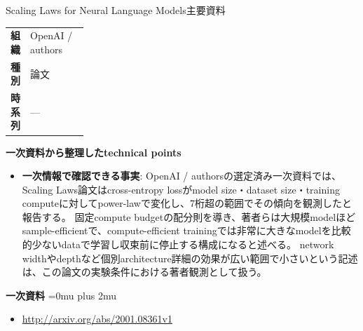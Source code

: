 \begin{technicalnote}{Scaling Laws for Neural Language Models}{主要資料}
\begingroup
\begin{tabularx}{\linewidth}{@{}>{\bfseries}p{0.22\linewidth}X@{}}
組織 & OpenAI / authors \\
種別 & 論文 \\
時系列 & — \\
\end{tabularx}
\smallskip
{\bfseries 一次資料から整理したtechnical points}
\begin{itemize}[leftmargin=1.5em,itemsep=0.35em]
\item \textbf{一次情報で確認できる事実}: OpenAI / authorsの選定済み一次資料では、Scaling Laws論文はcross-entropy lossがmodel size・dataset size・training computeに対してpower-lawで変化し、7桁超の範囲でその傾向を観測したと報告する。 固定compute budgetの配分則を導き、著者らは大規模modelほどsample-efficientで、compute-efficient trainingでは非常に大きなmodelを比較的少ないdataで学習し収束前に停止する構成になると述べる。 network widthやdepthなど個別architecture詳細の効果が広い範囲で小さいという記述は、この論文の実験条件における著者観測として扱う。
\end{itemize}
\begin{minipage}{\linewidth}
\begin{samepage}
{\bfseries 一次資料}
\begingroup\sloppy
\Urlmuskip=0mu plus 2mu\relax
\begin{itemize}[leftmargin=1.5em,itemsep=0.25em]
\item {\scriptsize\url{http://arxiv.org/abs/2001.08361v1}}
\end{itemize}
\endgroup
\end{samepage}
\end{minipage}
\endgroup
\end{technicalnote}
\medskip

